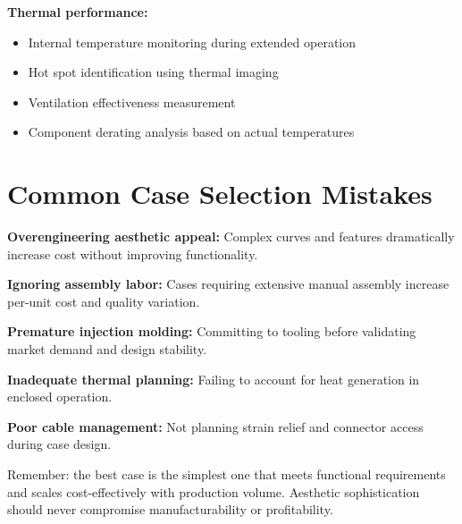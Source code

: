 \textbf{Thermal performance:}
\begin{itemize}
\item Internal temperature monitoring during extended operation
\item Hot spot identification using thermal imaging
\item Ventilation effectiveness measurement
\item Component derating analysis based on actual temperatures
\end{itemize}

\section{Common Case Selection Mistakes}

\textbf{Overengineering aesthetic appeal:} Complex curves and features dramatically increase cost without improving functionality.

\textbf{Ignoring assembly labor:} Cases requiring extensive manual assembly increase per-unit cost and quality variation.

\textbf{Premature injection molding:} Committing to tooling before validating market demand and design stability.

\textbf{Inadequate thermal planning:} Failing to account for heat generation in enclosed operation.

\textbf{Poor cable management:} Not planning strain relief and connector access during case design.

Remember: the best case is the simplest one that meets functional requirements and scales cost-effectively with production volume. Aesthetic sophistication should never compromise manufacturability or profitability.